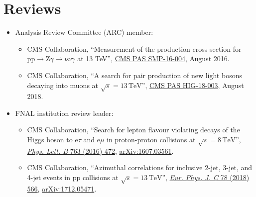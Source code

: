 \section{Reviews}
\begin{itemize}[leftmargin=12pt]
\item Analysis Review Committee (ARC) member:
\begin{itemize}[leftmargin=12pt]
\item CMS Collaboration, ``Measurement of the production cross section for $\text{p}\text{p} \to \text{Z}\gamma \to \nu\nu\gamma$ at 13 TeV'', \href{https://cds.cern.ch/record/2204922}{CMS PAS SMP-16-004}, August 2016.
\item CMS Collaboration, ``A search for pair production of new light bosons decaying into muons at $\sqrt{s} = 13\,\text{TeV}$'', \href{https://cds.cern.ch/record/2632275}{CMS PAS HIG-18-003}, August 2018.
\end{itemize}
\item FNAL institution review leader:
\begin{itemize}[leftmargin=12pt]
\item CMS Collaboration, ``Search for lepton flavour violating decays of the Higgs boson to e$\tau$ and e$\mu$ in proton-proton collisions at $\sqrt{s} = 8\,\text{TeV}$'', \href{http://dx.doi.org/10.1016/j.physletb.2016.09.062}{\emph{Phys. Lett. B} 763 (2016) 472}, \href{http://arxiv.org/abs/1607.03561}{arXiv:1607.03561}.
\item CMS Collaboration, ``Azimuthal correlations for inclusive 2-jet, 3-jet, and 4-jet events in pp collisions at $\sqrt{s} = 13\,\text{TeV}$'', \href{http://dx.doi.org/10.1140/epjc/s10052-018-6033-4}{\emph{Eur. Phys. J. C} 78 (2018) 566}, \href{http://arxiv.org/abs/1712.05471}{arXiv:1712.05471}.
\end{itemize}
\end{itemize}
